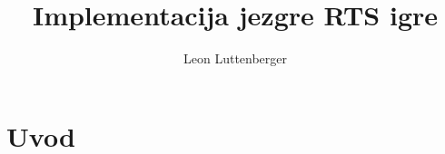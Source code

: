 \documentclass[times, utf8, zavrsni, numeric]{fer}
\begin{document}

\title{Implementacija jezgre RTS igre}

\author{Leon Luttenberger}

\maketitle

\izvornik{}

\zahvala{}

\tableofcontents

\chapter{Uvod}


\end{document}
